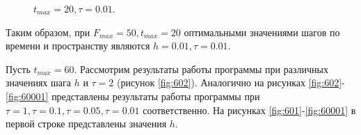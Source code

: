 \documentclass[a4paper,14pt]{article}
\begin{document}
\newpage
\begin{figure}[!h]
	\caption{$t_{max} = 20, \tau = 0.01$.}
	\label{fig:20001}
\end{figure}

Таким образом, при $F_{max} = 50, t_{max} = 20$ оптимальными значениями
шагов по времени и пространству являются $h = 0.01, \tau = 0.01$.

Пусть $t_{max} = 60$. Рассмотрим результаты работы программы
при различных значениях шага  $h$ и $\tau = 2$ (рисунок \ref{fig:602}). Аналогично на рисунках
\ref{fig:602}-\ref{fig:60001} представлены результаты работы программы при $\tau = 1, \tau = 0.1, \tau = 0.05, \tau = 0.01$
соответственно.  На рисунках \ref{fig:601}-\ref{fig:60001} в первой строке представлены значения $h$.
\end{document}
